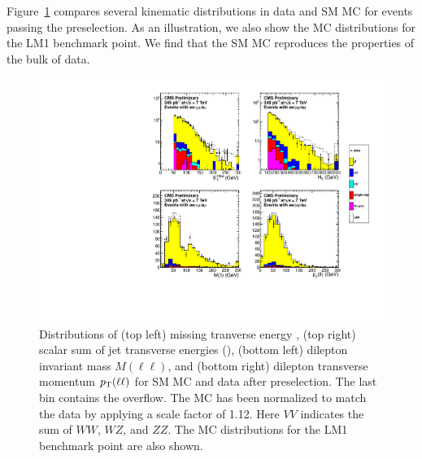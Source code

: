 
Figure~\ref{fig:bulk} compares several kinematic distributions in data and SM MC for events passing the preselection.
As an illustration, we also show the MC distributions for the LM1 benchmark point. We find that the SM MC reproduces 
the properties of the bulk of data. 


\begin{figure}[tbh]
\begin{center}
\includegraphics[width=1.0\linewidth]{plots_final/datamc_LM1_349pb.pdf}
\caption{\label{fig:bulk}\protect 
Distributions of (top left) missing tranverse energy \MET, (top right) scalar sum of jet transverse energies (\HT), 
(bottom left) dilepton invariant mass $M(\ell\ell)$, and (bottom right) dilepton transverse momentum $p_{\mathrm{T}}(\ell\ell)$ 
for SM MC and data after preselection. The last bin contains the overflow.
The MC has been normalized to match the data by applying a scale factor of 1.12.
Here $VV$ indicates the sum of $WW$, $WZ$, and $ZZ$. 
The MC distributions for the LM1 benchmark point are also shown.
}
\end{center}
\end{figure}
